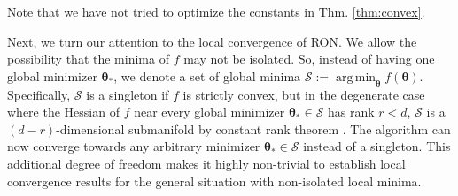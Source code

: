 \documentclass[11pt]{amsart}
\theoremstyle{plain}
\theoremstyle{definition}
\theoremstyle{remark}
\def\eps{\varepsilon}
\def\B{\mathbf{B}}
\def\tr{\textup{tr}}
\def\param{\boldsymbol{\theta}}
\DeclareMathOperator*{\argmin}{arg\,min}
\newcommand{\commHL}[1]{{\textcolor{blue}{#1}}}
\begin{document}
Note that we have not tried to optimize the constants in Thm. \ref{thm:convex}. %



Next, we turn our attention to the local convergence of RON. We allow the possibility that the minima of $f$ may not be isolated. So, instead of having one global minimizer $\param_*$, we denote a set of global minima $\mathcal{S}:= \argmin_{\param} f(\param)$. Specifically, $\mathcal{S}$ is a singleton if $f$ is strictly convex, but in the degenerate case where the Hessian of $f$ near every global minimizer $\param_{*}\in \mathcal{S}$ has rank $r<d$, 
$\mathcal{S}$ is a $(d-r)$-dimensional submanifold by constant rank theorem \cite{john2012introduction}. The algorithm can now converge towards any arbitrary minimizer $\param_{*}\in \mathcal{S}$ instead of a singleton. This additional degree of freedom makes it highly non-trivial to establish local convergence results for the general situation with non-isolated local minima. 
\end{document}
